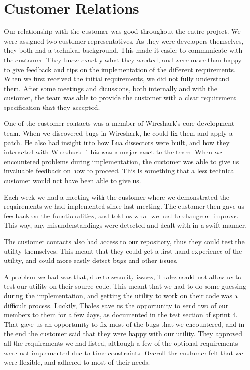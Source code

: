 \section{Customer Relations}
Our relationship with the customer was good throughout the entire project.
We were assigned two customer representatives. As they were developers themselves, they both had a technical background. This made it easier to communicate with the customer.
They knew exactly what they wanted, and were more than happy to give feedback and tips on the implementation of the different requirements. When we first received the initial requirements, we did not fully understand them. After some meetings and dicussions, both internally and with the customer, the team was able to provide the customer with a clear requirement specification that they accepted.

One of the customer contacts was a member of Wireshark's core development team. When we discovered bugs in Wireshark, he could fix them and apply a patch. He also had insight into how 
Lua dissectors were built, and how they interacted with Wireshark. This was a major asset to the team. When we encountered problems during implementation, the customer was able to give us invaluable feedback on how to proceed. This is something that a less technical customer would not have been able to give us.

Each week we had a meeting with the customer where we demonstrated the requirements we had implemented since last meeting. The customer then gave us feedback on the functionalities, and told us what we had to change or improve. This way, any misunderstandings were detected and dealt with in a swift manner.

The customer contacts also had access to our repository, thus they could test the utility themselves.
This meant that they could get a first hand-experience of the utility, and could more easily detect bugs and other issues.	

A problem we had was that, due to security issues, Thales could not allow us to test our utility on their source code. This meant that we had to do some guessing during the implementation, and getting the utility to work on their code was a difficult process. Luckily, Thales gave us the opportunity to send two of our members to them for a few days, as documented in the test section of sprint 4. That gave us an opportunity to fix most of the bugs that we encountered, and in the end the customer said that they were happy with our utility. They approved all the requirements we had listed, although a few of the optional requirements were not implemented due to time constraints.
Overall the customer felt that we were flexible, and adhered to most of their needs.

